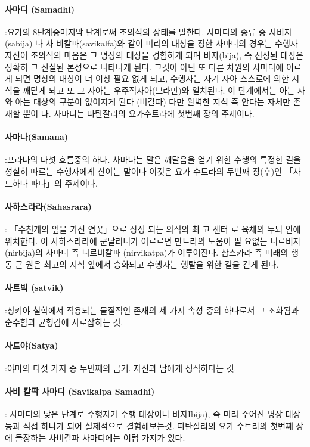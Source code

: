 \documentclass[12pt, a4paper, oneside]{book}
\begin{document}
\paragraph{사마디 (Samadhi)} :요가의 8단계중마지막 단계로써 초의식의 상태를 말한다. 사마디의 종류 중 사비자 (sabija) 나 사 비칼파(savikalfa)와 같이 미리의 대상을 정한 사마디의 경우는 수행자 자신이 초의식의 마음은 그 명상의 대상을 경험하게 되며 비자(bija), 즉 선정된 대상은 정확히 그 진실된 본성으로 나타나게 된다. 그것이 아닌 또 다른 차원의 사마디에 이르게 되면 명상의 대상이 더 이상 필요 없게 되고, 수행자는 자기 자아 스스로에 의한 지식을 깨닫게 되고 또 그 자아는 우주적자아(브라만)와 일치된다. 이 단계에서는 아는 자와 아는 대상의 구분이 없어지게 된다 (비칼파) 다만 완벽한 지식 즉 안다는 자체만 존재할 뿐이  다. 사마디는 파탄잘리의 요가수트라에 첫번째 장의 주제이다.

\paragraph{사마나(Samana)} :프라나의 다섯 흐름중의 하나. 사마나는 말은 깨달음을 얻기 위한 수행의 특정한 길을 성실히 따르는 수행자에게 산이는 말이다 이것은 요가 수트라의 두번째 장(후)인 「사드하나 파다」의 주제이다.

\paragraph{사하스라라(Sahasrara)} : 「수천개의 잎을 가진 연꽃」으로 상징 되는 의식의 최 고 센터 로 육체의 두뇌 안에 위치한다. 이 사하스라라에 쿤달리니가 이르르면 만트라의 도움이 필  요없는 니르비자(nirbija)의 사마디 즉 니르비칼파 (nirvikatpa)가 이루어진다. 삼스카라 즉 미래의 행동 근   원은 최고의 지식 앞에서 승화되고 수행자는 행탈을 위한 길을 걷게 된다.

\paragraph{사트빅 (satvik)} :상키야 철학에서 적용되는 물질적인 존재의 세 가지 속성 중의 하나로서 그 조화됨과 순수함과 균형감에 사로잡히는 것.

\paragraph{사트야(Satya)} :야마의 다섯 가지 중 두번째의 금기. 자신과 남에게 정직하다는 것.

\paragraph{사비 칼팍 사마디 (Savikalpa Samadhi)} : 사마디의 낮은 단계로 수행자가 수행 대상이나 비자Ibija), 즉 미리 주어진 명상 대상 둥과 직접 하나가 되어 실제적으로 결험해보는것. 파탄잘리의 요가 수트라의 첫번째 장에 들장하는 사비칼파 사마디에는 여텁 가지가 있다.
\end{document}
